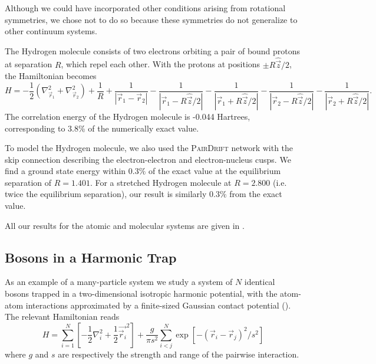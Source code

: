 \documentclass[12pt]{msml2020} %
\newcommand*{\br}{\vec{r}}
\newcommand*{\bz}{\vec{z}}
\begin{document}
Although we could have incorporated other conditions arising from rotational symmetries, we chose not to do so because these symmetries do not generalize to other continuum systems.

The Hydrogen molecule consists of two electrons orbiting a pair of bound protons at separation $R$, which repel each other. With the protons at positions $\pm R\hat{\bz}/2$, the Hamiltonian becomes
%
\begin{equation}\label{eq:hydrogenMol_Hamiltonian}
H = - \frac{1}{2}   \left(\nabla_{\br_1}^{2} + \nabla_{\br_2}^{2} \right)  + \frac{1}{R} + \frac{1}{|\br_{1} - \br_{2}|} -  \frac{1}{|\br_{1} - R\hat{\bz}/2|} -  \frac{1}{|\br_{1} + R\hat{\bz}/2|}
-  \frac{1}{|\br_{2} - R\hat{\bz}/2|} -  \frac{1}{|\br_{2} + R\hat{\bz}/2|}.
\end{equation}
%
The correlation energy of the Hydrogen molecule is -0.044 Hartrees, corresponding to 3.8\% of the numerically exact value. %

To model the Hydrogen molecule, we also used the  \textsc{PairDrift} network with the skip connection describing the electron-electron and electron-nucleus cusps. We find a ground state energy within $0.3 \%$ of the exact value at the equilibrium separation of $R=1.401$. For a stretched Hydrogen molecule at $R=2.800$ (i.e. twice the equilibrium separation), our result is similarly $0.3 \%$ from the exact value. 

All our results for the atomic and molecular systems are given in .


\subsection{Bosons in a Harmonic Trap}

As an example of a many-particle system we study a system of $N$ identical bosons trapped in a two-dimensional isotropic harmonic potential, with the atom-atom interactions approximated by a finite-sized Gaussian contact potential (\cite{Mujal:2017aa}).  The relevant Hamiltonian reads
%
\begin{equation}\label{eq:harmonic_Hamiltonian} 
H =  \sum_{i = 1}^{N} \left[ - \frac{1}{2}  \nabla_{i}^{2} + \frac{1}{2}\vec{\br_{i}}^{2} \right] +  \frac{g}{\pi s^{2}}\sum_{i < j }^{N}\exp\left[-\left(\br_{i} - \br_{j}\right)^2/s^2\right] 
\end{equation} 
%
where $g$ and $s$ are respectively the strength and range of the pairwise interaction. \break
\end{document}
